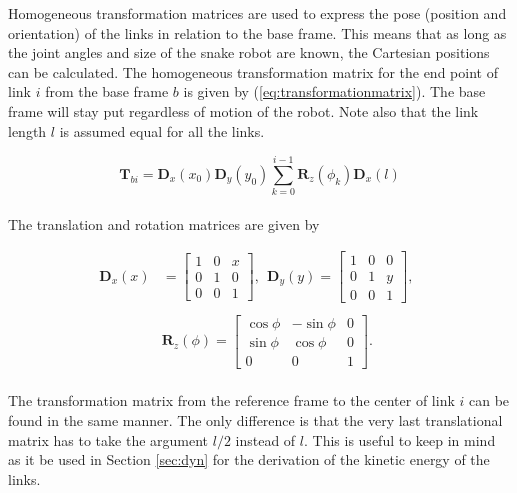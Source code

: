 Homogeneous transformation matrices are used to express the pose (position and orientation) of the links in relation to the base frame. This means that as long as the joint angles and size of the snake robot are known, the Cartesian positions can be calculated.
The homogeneous transformation matrix for the end point of link $i$ from the base frame $b$ is given by (\ref{eq:transformationmatrix}). The base frame will stay put regardless of motion of the robot. Note also that the link length $l$ is assumed equal for all the links.

\begin{equation} \label{eq:transformationmatrix}
    \textbf{T}_{b i} = \textbf{D}_x(x_0) \textbf{D}_y(y_0) \sum_{k=0}^{i-1} \textbf{R}_z(\phi_k) \textbf{D}_x(l)
\end{equation}
\\
The translation and rotation matrices are given by

\begin{equation}\label{eq:trans_rot}
    \begin{split}
        \textbf{D}_x(x)& = 
        \begin{bmatrix}
            1 & 0 & x \\
            0 & 1 & 0 \\
            0 & 0 & 1
        \end{bmatrix}, \ \
        \textbf{D}_y(y) =
        \begin{bmatrix}
            1 & 0 & 0 \\
            0 & 1 & y \\
            0 & 0 & 1
        \end{bmatrix}, \ \
        \\&
        \\&\textbf{R}_z(\phi) =
        \begin{bmatrix}
            \cos{\phi} & -\sin{\phi} & 0 \\
            \sin{\phi} &  \cos{\phi} & 0 \\
            0          &  0          & 1
        \end{bmatrix}.
    \end{split}
\end{equation}
\\
The transformation matrix from the reference frame to the center of link $i$ can be found in the same manner. The only difference is that the very last translational matrix has to take the argument $l/2$ instead of $l$. This is useful to keep in mind as it be used in Section \ref{sec:dyn} for the derivation of the kinetic energy of the links.

